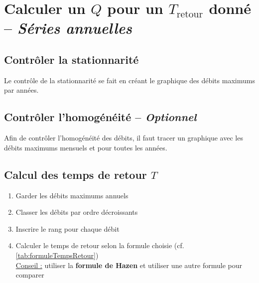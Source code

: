 \chapter{Calculer un $Q$ pour un $T_\text{retour}$ donné -- \textit{Séries annuelles}}



\section{Contrôler la stationnarité} \label{sec:controleStationnarite}
Le contrôle de la stationnarité se fait en créant le graphique des débits maximums par années. \\


\section{Contrôler l'homogénéité -- \textit{Optionnel}}
Afin de contrôler l'homogénéité des débits, il faut tracer un graphique avec les débits maximums mensuels et pour toutes les années. \\


\section{Calcul des temps de retour $T$}
\begin{enumerate}
    \item Garder les débits maximums annuels
    \item Classer les débits par ordre décroissants
    \item Inscrire le rang pour chaque débit
    \item Calculer le temps de retour selon la formule choisie (cf. \ref{tab:formuleTempsRetour}) \\
    \underline{Conseil :} utiliser la \textbf{{\color{red} formule de Hazen}} et utiliser une autre formule pour comparer
\end{enumerate}


